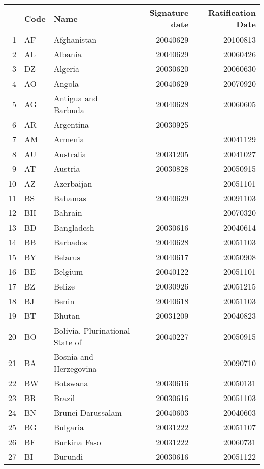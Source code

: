 \begin{longtable}{rllrr}
  \toprule
 & Code & Name & Signature date & Ratification Date \\ 
  \midrule
1 & AF & Afghanistan & 20040629 & 20100813 \\ 
  2 & AL & Albania & 20040629 & 20060426 \\ 
  3 & DZ & Algeria & 20030620 & 20060630 \\ 
  4 & AO & Angola & 20040629 & 20070920 \\ 
  5 & AG & Antigua and Barbuda & 20040628 & 20060605 \\ 
  6 & AR & Argentina & 20030925 &  \\ 
  7 & AM & Armenia &  & 20041129 \\ 
  8 & AU & Australia & 20031205 & 20041027 \\ 
  9 & AT & Austria & 20030828 & 20050915 \\ 
  10 & AZ & Azerbaijan &  & 20051101 \\ 
  11 & BS & Bahamas & 20040629 & 20091103 \\ 
  12 & BH & Bahrain &  & 20070320 \\ 
  13 & BD & Bangladesh & 20030616 & 20040614 \\ 
  14 & BB & Barbados & 20040628 & 20051103 \\ 
  15 & BY & Belarus & 20040617 & 20050908 \\ 
  16 & BE & Belgium & 20040122 & 20051101 \\ 
  17 & BZ & Belize & 20030926 & 20051215 \\ 
  18 & BJ & Benin & 20040618 & 20051103 \\ 
  19 & BT & Bhutan & 20031209 & 20040823 \\ 
  20 & BO & Bolivia, Plurinational State of & 20040227 & 20050915 \\ 
  21 & BA & Bosnia and Herzegovina &  & 20090710 \\ 
  22 & BW & Botswana & 20030616 & 20050131 \\ 
  23 & BR & Brazil & 20030616 & 20051103 \\ 
  24 & BN & Brunei Darussalam & 20040603 & 20040603 \\ 
  25 & BG & Bulgaria & 20031222 & 20051107 \\ 
  26 & BF & Burkina Faso & 20031222 & 20060731 \\ 
  27 & BI & Burundi & 20030616 & 20051122 \\ 

\end{longtable}
